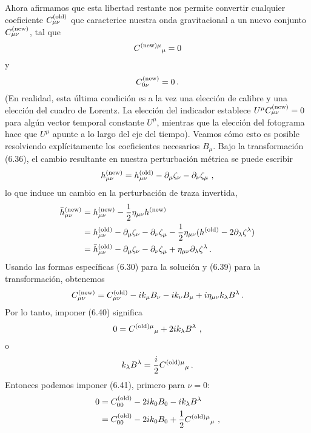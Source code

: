 \documentclass[11pt,b5paper,openany,twoside]{book}
\newcommand{\mn}{{\mu\nu}}
\newcommand{\p}[1]{{\partial_{#1}}}
\def\bh{{\bar h}}
\begin{document}
Ahora afirmamos que esta libertad restante nos permite convertir cualquier coeficiente $C^{\rm (old)}_\mn$ que caracterice nuestra onda gravitacional a un nuevo conjunto $C^{\rm (new)}_\mn$, tal que
\begin{equation}
C^{{\rm (new)}\mu}{}_\mu = 0\label{6.40}
\end{equation}
y
\begin{equation}
C^{\rm (new)}_{0\nu}=0\,.\label{6.41}
\end{equation}
(En realidad, esta última condición es a la vez una elección de calibre y una elección del cuadro de Lorentz.
La elección del indicador establece $U^\mu C^{\rm (new)}_{\mu\nu}=0$ para algún vector temporal constante $U^\mu$, mientras que la elección del fotograma hace que $U^\mu$ apunte a lo largo del eje del tiempo).
Veamos cómo esto es posible resolviendo explícitamente los coeficientes necesarios $B_\mu$.
Bajo la transformación (6.36), el cambio resultante en nuestra perturbación métrica se puede escribir
\begin{equation}
h^{\rm (new)}_\mn = h^{\rm (old)}_\mn -\p\mu \zeta_\nu
-\p\nu \zeta_\mu\ ,\label{6.42}
\end{equation}
lo que induce un cambio en la perturbación de traza invertida,
\begin{align}
\bh^{\rm (new)}_\mn  &=  h^{\rm (new)}_\mn -{1\over 2}
\eta_\mn h^{\rm (new)} \notag \\  &= h^{\rm (old)}_\mn -\p\mu \zeta_\nu
-\p\nu \zeta_\mu -{1\over 2}\eta_\mn(h^{\rm (old)}
-2\p\lambda \zeta^\lambda) \notag \\
&=  \bh^{\rm (old)}_\mn -\p\mu \zeta_\nu -\p\nu \zeta_\mu
+\eta_\mn\p\lambda \zeta^\lambda\,. \label{6.43}
\end{align}
Usando las formas específicas (6.30) para la solución y (6.39) para la transformación, obtenemos
\begin{equation}
C^{\rm (new)}_\mn =C^{\rm (old)}_\mn - ik_\mu B_\nu -i k_\nu B_\mu
+i\eta_\mn k_\lambda B^\lambda\,.\label{6.44}
\end{equation}
Por lo tanto, imponer (6.40) significa
\begin{equation}
0= C^{{\rm (old)}\mu}{}_\mu +2ik_\lambda B^\lambda\ ,\label{6.45}
\end{equation}
o
\begin{equation}
k_\lambda B^\lambda = {{i}\over 2}C^{{\rm (old)}\mu}{}_\mu\,.
\label{6.46}
\end{equation}
Entonces podemos imponer (6.41), primero para $\nu=0$:
\begin{align}
0  &=  C^{\rm (old)}_{00}-2ik_0B_0-ik_\lambda B^\lambda \notag \\
&=  C^{\rm (old)}_{00}-2ik_0B_0 +{1\over 2}C^{{\rm (old)}\mu}{}_\mu
\ , \label{6.47}
\end{align}
\end{document}
